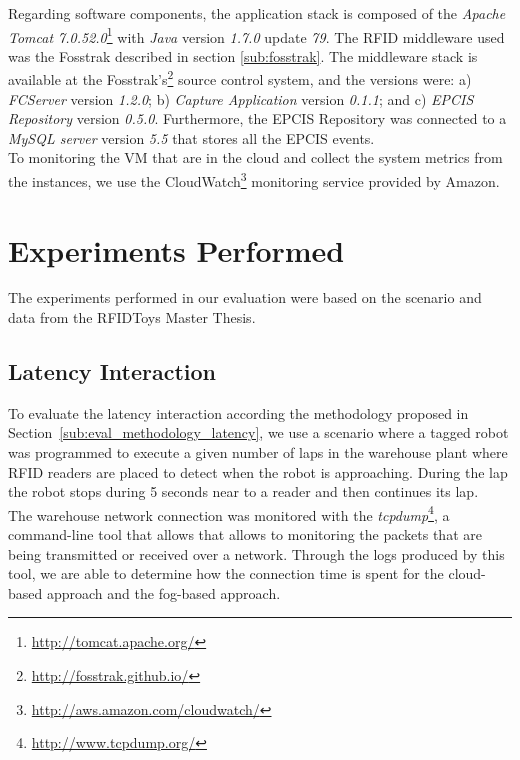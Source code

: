 Regarding software components, the application stack is composed of the \textit{Apache Tomcat 7.0.52.0}\footnote{\url{http://tomcat.apache.org/}}
with \textit{Java} version \textit{1.7.0} update \textit{79}. The \gls{RFID} middleware used was the Fosstrak
described in section \ref{sub:fosstrak}. The middleware stack is available at the Fosstrak's\footnote{\url{http://fosstrak.github.io/}}
source control system, and the versions were: a) \textit{\gls{FCServer}} version \textit{1.2.0}; b) \textit{Capture Application}
version \textit{0.1.1}; and c) \textit{\gls{EPCIS} Repository} version \textit{0.5.0}. Furthermore,
the \gls{EPCIS} Repository was connected to a \textit{MySQL server} version \textit{5.5} that stores
all the \gls{EPCIS} events.\\

To monitoring the \gls{VM} that are in the cloud and collect the system metrics from the instances,
we use the CloudWatch\footnote{\url{http://aws.amazon.com/cloudwatch/}} monitoring service provided by Amazon.

\section{Experiments Performed}
\label{sec:eval_experiments}
The experiments performed in our evaluation were based on the scenario and data from the RFIDToys\cite{Correia:Thesis:2014}
Master Thesis.

\subsection{Latency Interaction}
\label{sub:eval_exp_latency}
To evaluate the latency interaction according the methodology proposed in Section~\ref{sub:eval_methodology_latency},
we use a scenario where a tagged robot was programmed to execute a given number of laps in the
warehouse plant where \gls{RFID} readers are placed to detect when the robot is approaching.
During the lap the robot stops during 5 seconds near to a reader and then continues its lap.\\

The warehouse network connection was monitored with the \textit{tcpdump}\footnote{\url{http://www.tcpdump.org/}},
a command-line tool that allows that allows to monitoring the packets that are being transmitted or
received over a network. Through the logs produced by this tool, we are able to determine how the
connection time is spent for the cloud-based approach and the fog-based approach.\\

